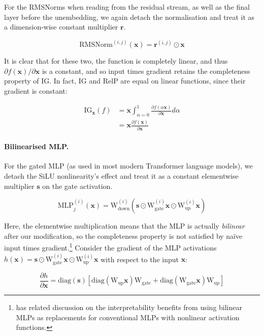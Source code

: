 \documentclass{article}
\theoremstyle{plain}
\theoremstyle{definition}
\theoremstyle{remark}
\begin{document}
For the RMSNorms when reading from the residual stream, as well as the final layer before the unembedding, we again detach the normalisation and treat it as a dimension-wise constant multiplier $\mathbf{r}$.

\begin{equation}
\mathrm{RMSNorm}^{(i,j)}(\mathbf{x}) = \mathbf{r}^{(i,j)} \odot \mathbf{x}
\end{equation}

It is clear that for these two, the function is completely linear, and thus $\partial f(\mathbf{x}) / \partial \mathbf{x}$ is a constant, and so input times gradient retains the completeness property of IG. In fact, IG and RelP are equal on linear functions, since their gradient is constant:

\begin{align}
\mathrm{IG}_\mathbf{x}(f) &= \mathbf{x}\int_{\alpha=0}^1\frac{\partial f(\alpha \mathbf{x})}{\partial \mathbf{x}} d \alpha\\
&= \mathbf{x}\frac{\partial f(\mathbf{x})}{\partial \mathbf{x}}
\end{align}

\paragraph{Bilinearised MLP.}  For the gated MLP (as used in most modern Transformer language models), we detach the SiLU nonlinearity's effect and treat it as a constant elementwise multiplier $\mathbf{s}$ on the gate activation.

\begin{equation}\mathrm{MLP}^{(i)}_j(\mathbf{x}) = \mathrm{W}_\text{down}^{(i)}\left(\mathbf{s} \odot \mathrm{W}_\text{gate}^{(i)}\mathbf{x} \odot \mathrm{W}_\text{up}^{(i)}\mathbf{x}\right)\end{equation}

Here, the elementwise multiplication means that the MLP is actually \textit{bilinear} after our modification, so the completeness property is not satisfied by naïve input times gradient.\footnote{\citet{pearce2025bilinear} has related discussion on the interpretability benefits from using bilinear MLPs as replacements for conventional MLPs with nonlinear activation functions.} Consider the gradient of the MLP activations $h(\mathbf{x}) = \mathbf{s} \odot \mathrm{W}_\text{gate}^{(i)}\mathbf{x} \odot \mathrm{W}_\text{up}^{(i)}\mathbf{x}$ with respect to the input $\mathbf{x}$:

\begin{equation}\frac{\partial h}{\partial \mathbf{x}} = \mathrm{diag}(\mathbf{s}) [\mathrm{diag}(\mathrm{W}_\text{up}\mathbf{x}) \mathrm{W}_\text{gate} + \mathrm{diag}(\mathrm{W}_\text{gate}\mathbf{x}) \mathrm{W}_\text{up} ]\end{equation}
\end{document}
